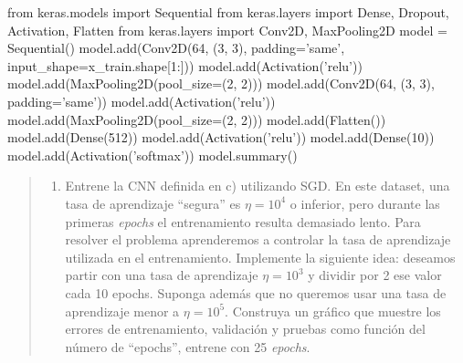 \documentclass[11pt]{article}
\providecommand{\tightlist}{%
      \setlength{\itemsep}{0pt}\setlength{\parskip}{0pt}}
\newenvironment{Shaded}{}{}
\newcommand{\DecValTok}[1]{\textcolor[rgb]{0.25,0.63,0.44}{{#1}}}
\newcommand{\StringTok}[1]{\textcolor[rgb]{0.25,0.44,0.63}{{#1}}}
\newcommand{\NormalTok}[1]{{#1}}
\newcommand{\ImportTok}[1]{{#1}}
\newcommand{\OperatorTok}[1]{\textcolor[rgb]{0.40,0.40,0.40}{{#1}}}
\begin{document}
\begin{Shaded}
\begin{Highlighting}[]
\ImportTok{from}\NormalTok{ keras.models }\ImportTok{import}\NormalTok{ Sequential}
\ImportTok{from}\NormalTok{ keras.layers }\ImportTok{import}\NormalTok{ Dense, Dropout, Activation, Flatten}
\ImportTok{from}\NormalTok{ keras.layers }\ImportTok{import}\NormalTok{ Conv2D, MaxPooling2D}
\NormalTok{model }\OperatorTok{=}\NormalTok{ Sequential()}
\NormalTok{model.add(Conv2D(}\DecValTok{64}\NormalTok{, (}\DecValTok{3}\NormalTok{, }\DecValTok{3}\NormalTok{), padding}\OperatorTok{=}\StringTok{'same'}\NormalTok{, input_shape}\OperatorTok{=}\NormalTok{x_train.shape[}\DecValTok{1}\NormalTok{:]))}
\NormalTok{model.add(Activation(}\StringTok{'relu'}\NormalTok{))}
\NormalTok{model.add(MaxPooling2D(pool_size}\OperatorTok{=}\NormalTok{(}\DecValTok{2}\NormalTok{, }\DecValTok{2}\NormalTok{)))}
\NormalTok{model.add(Conv2D(}\DecValTok{64}\NormalTok{, (}\DecValTok{3}\NormalTok{, }\DecValTok{3}\NormalTok{), padding}\OperatorTok{=}\StringTok{'same'}\NormalTok{))}
\NormalTok{model.add(Activation(}\StringTok{'relu'}\NormalTok{))}
\NormalTok{model.add(MaxPooling2D(pool_size}\OperatorTok{=}\NormalTok{(}\DecValTok{2}\NormalTok{, }\DecValTok{2}\NormalTok{)))}
\NormalTok{model.add(Flatten())}
\NormalTok{model.add(Dense(}\DecValTok{512}\NormalTok{))}
\NormalTok{model.add(Activation(}\StringTok{'relu'}\NormalTok{))}
\NormalTok{model.add(Dense(}\DecValTok{10}\NormalTok{))}
\NormalTok{model.add(Activation(}\StringTok{'softmax'}\NormalTok{))}
\NormalTok{model.summary()}
\end{Highlighting}
\end{Shaded}

\begin{quote}
\begin{enumerate}
\def\labelenumi{\alph{enumi})}
\setcounter{enumi}{3}
\tightlist
\item
  Entrene la CNN definida en c) utilizando SGD. En este dataset, una
  tasa de aprendizaje ``segura'' es \(\eta = 10^4\) o inferior, pero
  durante las primeras \emph{epochs} el entrenamiento resulta demasiado
  lento. Para resolver el problema aprenderemos a controlar la tasa de
  aprendizaje utilizada en el entrenamiento. Implemente la siguiente
  idea: deseamos partir con una tasa de aprendizaje \(\eta = 10^3\) y
  dividir por 2 ese valor cada 10 epochs. Suponga además que no queremos
  usar una tasa de aprendizaje menor a \(\eta = 10^5\). Construya un
  gráfico que muestre los errores de entrenamiento, validación y pruebas
  como función del número de ``epochs'', entrene con 25 \emph{epochs}.
\end{enumerate}
\end{quote}
\end{document}
